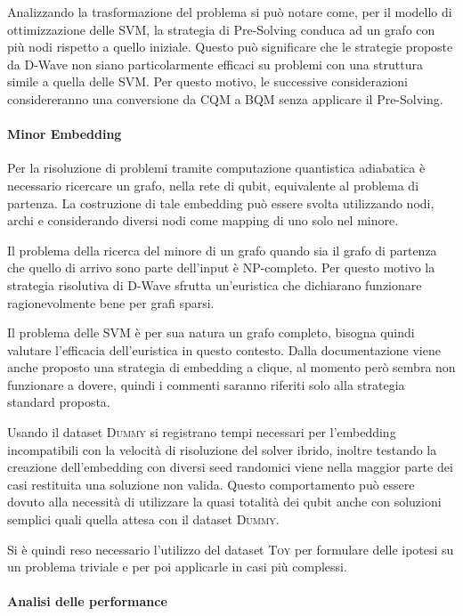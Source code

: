 \documentclass[12pt]{article}
\begin{document}
Analizzando la trasformazione del problema si può notare come, per il modello di ottimizzazione delle SVM, la strategia di Pre-Solving conduca ad un grafo con più nodi rispetto a quello iniziale.
Questo può significare che le strategie proposte da D-Wave non siano particolarmente efficaci su problemi con una struttura simile a quella delle SVM.
Per questo motivo, le successive considerazioni considereranno una conversione da CQM a BQM senza applicare il Pre-Solving.

\paragraph{Minor Embedding}

Per la risoluzione di problemi tramite computazione quantistica adiabatica è necessario ricercare un grafo, nella rete di qubit, equivalente al problema di partenza.
La costruzione di tale embedding può essere svolta utilizzando nodi, archi e considerando diversi nodi come mapping di uno solo nel minore.

Il problema della ricerca del minore di un grafo quando sia il grafo di partenza che quello di arrivo sono parte dell'input è NP-completo.
Per questo motivo la strategia risolutiva di D-Wave sfrutta un'euristica che dichiarano funzionare ragionevolmente bene per grafi sparsi.

Il problema delle SVM è per sua natura un grafo completo, bisogna quindi valutare l'efficacia dell'euristica in questo contesto.
Dalla documentazione viene anche proposto una strategia di embedding a clique, al momento però sembra non funzionare a dovere, quindi i commenti saranno riferiti solo alla strategia standard proposta.

Usando il dataset \textsc{Dummy} si registrano tempi necessari per l'embedding incompatibili con la velocità di risoluzione del solver ibrido,
inoltre testando la creazione dell'embedding con diversi seed randomici viene nella maggior parte dei casi restituita una soluzione non valida.
Questo comportamento può essere dovuto alla necessità di utilizzare la quasi totalità dei qubit anche con soluzioni semplici quali quella attesa con il dataset \textsc{Dummy}.

Si è quindi reso necessario l'utilizzo del dataset \textsc{Toy} per formulare delle ipotesi su un problema triviale e per poi applicarle in casi più complessi.

\paragraph{Analisi delle performance}
\end{document}
